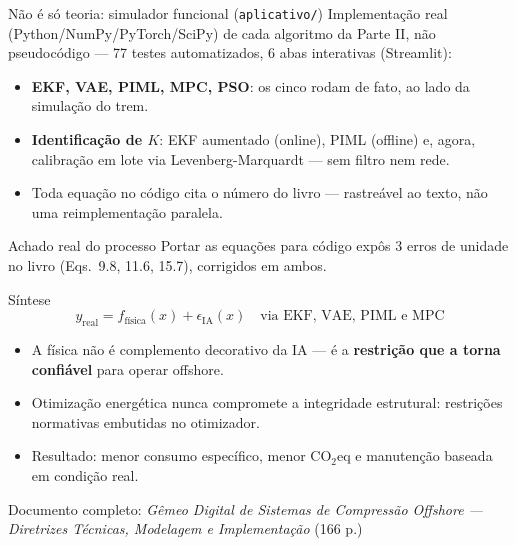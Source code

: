 \documentclass[aspectratio=169,12pt]{beamer}
\begin{document}
\begin{frame}{Não é só teoria: simulador funcional (\texttt{aplicativo/})}
	Implementação real (Python/NumPy/PyTorch/SciPy) de cada algoritmo da Parte II, não pseudocódigo — 77 testes automatizados, 6 abas interativas (Streamlit):
	\begin{itemize}
		\item \textbf{EKF, VAE, PIML, MPC, PSO}: os cinco rodam de fato, ao lado da simulação do trem.
		\item \textbf{Identificação de $K$}: EKF aumentado (online), PIML (offline) e, agora, calibração em lote via Levenberg-Marquardt — sem filtro nem rede.
		\item Toda equação no código cita o número do livro — rastreável ao texto, não uma reimplementação paralela.
	\end{itemize}
	\begin{alertblock}{Achado real do processo}
		Portar as equações para código expôs 3 erros de unidade no livro (Eqs.\ 9.8, 11.6, 15.7), corrigidos em ambos.
	\end{alertblock}
\end{frame}

\begin{frame}{Síntese}
	\begin{equation*}
		\boxed{\;y_{\text{real}} = f_{\text{física}}(x) + \epsilon_{\text{IA}}(x) \quad \text{via EKF, VAE, PIML e MPC}\;}
	\end{equation*}
	\vfill
	\begin{itemize}
		\item A física não é complemento decorativo da IA — é a \textbf{restrição que a torna confiável} para operar offshore.
		\item Otimização energética nunca compromete a integridade estrutural: restrições normativas embutidas no otimizador.
		\item Resultado: menor consumo específico, menor CO$_2$eq e manutenção baseada em condição real.
	\end{itemize}
	\vfill
	\centering
	\small Documento completo: \textit{Gêmeo Digital de Sistemas de Compressão Offshore — Diretrizes Técnicas, Modelagem e Implementação} (166 p.)
\end{frame}
\end{document}
